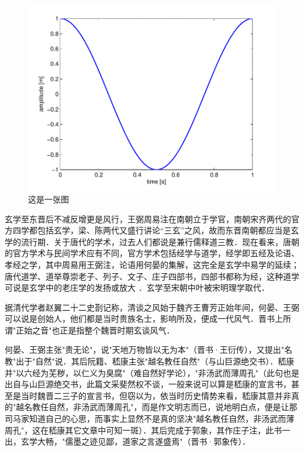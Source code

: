 \begin{figure}[ht]
	\centering
	\includegraphics[width=\linewidth]{pic/results}
	\caption{这是一张图}
	\label{fig:results}
\end{figure}

玄学至东晋后不减反增更是风行，王弼周易注在南朝立于学官，南朝宋齐两代的官方四学都包括玄学，梁、陈两代又盛行讲论“三玄”之风，故而东晋南朝都应当是玄学的流行期．关于唐代的学术，过去人们都说是兼行儒释道三教．现在看来，唐朝的官方学术与民间学术应有不同，官方学术包括经学与道学，经学即五经及论语、孝经之学，其中周易用王弼注，论语用何晏的集解，这完全是玄学中易学的延续；唐代道学、道举尊崇老子、列子、文子、庄子四部书，四部书都称为经，这种道学可说是玄学中的老庄学的发扬或放大\cite{bollag2010clinical}  ．玄学至宋朝中叶被宋明理学取代．

据清代学者赵翼二十二史剳记称，清谈之风始于魏齐王曹芳正始年间，何晏、王弼可以说是创始人，他们都是当时贵族名士，影响所及，便成一代风气．晋书上所谓"正始之音"也正是指整个魏晋时期玄谈风气．

何晏、王弼主张"贵无论"，说"天地万物皆以无为本"（晋书·王衍传），又提出"名教"出于"自然"说．其后阮籍、嵇康主张"越名教任自然"（与山巨源绝交书）．嵇康并"以六经为芜秽，以仁义为臭腐"（难自然好学论），"非汤武而薄周孔"（此句也是出自与山巨源绝交书，此篇文采斐然权不谈，一般来说可以算是嵇康的宣言书，甚至是当时魏晋二三子的宣言书，但窃以为，依当时历史情势来看，嵇康其意并非真的"越名教任自然，非汤武而薄周孔"，而是作文明志而已，说地明白点，便是让那司马家知道自己的心思，而事实上显然不是真的坚决"越名教任自然，非汤武而薄周孔"，这在嵇康其它文章中可知一斑）．其后完成于郭象，其作庄子注，此书一出，玄学大畅，"儒墨之迹见鄙，道家之言遂盛焉"（晋书·郭象传）．

